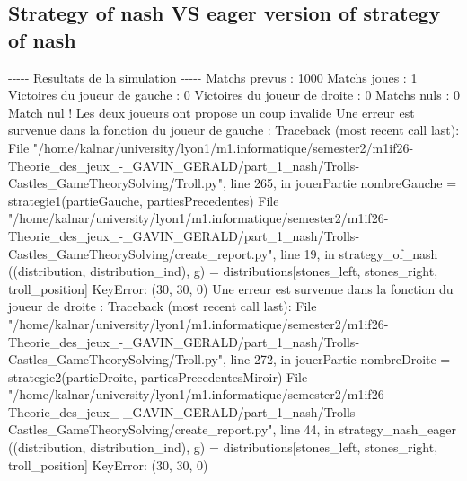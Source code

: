 \documentclass{article}%
\begin{document}
\subsection{Strategy of nash VS eager version of strategy of nash}%
\label{subsec:Strategy of nash VS eager version of strategy of nash}%
{-}{-}{-}{-}{-} Resultats de la simulation {-}{-}{-}{-}{-}\newline%
		\newline%
Matchs prevus : 1000\newline%
Matchs joues : 1\newline%
\newline%
Victoires du joueur de gauche : 0\newline%
Victoires du joueur de droite : 0\newline%
Matchs nuls : 0\newline%
\newline%
Match nul ! Les deux joueurs ont propose un coup invalide\newline%
Une erreur est survenue dans la fonction du joueur de gauche : \newline%
Traceback (most recent call last):\newline%
  File "/home/kalnar/university/lyon1/m1.informatique/semester2/m1if26{-}Theorie\_des\_jeux\_{-}\_GAVIN\_GERALD/part\_1\_nash/Trolls{-}Castles\_GameTheorySolving/Troll.py", line 265, in jouerPartie\newline%
    nombreGauche = strategie1(partieGauche, partiesPrecedentes)\newline%
  File "/home/kalnar/university/lyon1/m1.informatique/semester2/m1if26{-}Theorie\_des\_jeux\_{-}\_GAVIN\_GERALD/part\_1\_nash/Trolls{-}Castles\_GameTheorySolving/create\_report.py", line 19, in strategy\_of\_nash\newline%
    ((distribution, distribution\_ind), g) = distributions{[}stones\_left, stones\_right, troll\_position{]}\newline%
KeyError: (30, 30, 0)\newline%
\newline%
Une erreur est survenue dans la fonction du joueur de droite : \newline%
Traceback (most recent call last):\newline%
  File "/home/kalnar/university/lyon1/m1.informatique/semester2/m1if26{-}Theorie\_des\_jeux\_{-}\_GAVIN\_GERALD/part\_1\_nash/Trolls{-}Castles\_GameTheorySolving/Troll.py", line 272, in jouerPartie\newline%
    nombreDroite = strategie2(partieDroite, partiesPrecedentesMiroir)\newline%
  File "/home/kalnar/university/lyon1/m1.informatique/semester2/m1if26{-}Theorie\_des\_jeux\_{-}\_GAVIN\_GERALD/part\_1\_nash/Trolls{-}Castles\_GameTheorySolving/create\_report.py", line 44, in strategy\_nash\_eager\newline%
    ((distribution, distribution\_ind), g) = distributions{[}stones\_left, stones\_right, troll\_position{]}\newline%
KeyError: (30, 30, 0)\newline%
\end{document}

